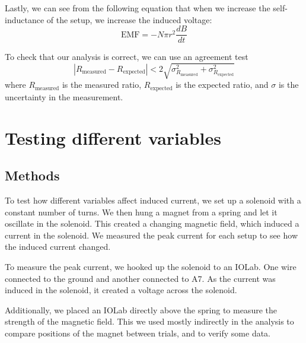 \documentclass[11pt]{article}
\let\oldsection\section
\renewcommand\section{\clearpage\oldsection}
\begin{document}
    Lastly, we can see from the following equation that when we increase the self-inductance of the setup, we increase the induced voltage: 
    \begin{equation}
        \text{EMF} = -N \pi r^2 \frac{dB}{dt}
        \label{eq:self_inductance}
    \end{equation}
    
    To check that our analysis is correct, we can use an agreement test
    \begin{equation}
        |R_{\text{measured}} - R_{\text{expected}}| < 2 \sqrt{\sigma_{R_{\text{measured}}}^2 + \sigma_{R_{\text{expected}}}^2}
        \label{eq:agreement}
    \end{equation}
    where $R_{\text{measured}}$ is the measured ratio, $R_{\text{expected}}$ is the expected ratio, and $\sigma$ is the uncertainty in the measurement.

    \section{Testing different variables}\label{sec:part_1}

    \subsection{Methods}\label{subsec:part_1_methods}

    To test how different variables affect induced current, we set up a solenoid with a constant number of turns.
    We then hung a magnet from a spring and let it oscillate in the solenoid.
    This created a changing magnetic field, which induced a current in the solenoid.
    We measured the peak current for each setup to see how the induced current changed.

    To measure the peak current, we hooked up the solenoid to an IOLab.
    One wire connected to the ground and another connected to A7.
    As the current was induced in the solenoid, it created a voltage across the solenoid.

    Additionally, we placed an IOLab directly above the spring to measure the strength of the magnetic field.
    This we used mostly indirectly in the analysis to compare positions of the magnet between trials, and to verify some data.
\end{document}
